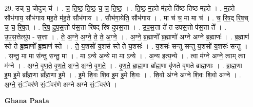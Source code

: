 \documentclass[17pt]{extarticle}
\begin{document}
29. उच् च॒ चोदुच् च॑ । . च॒ ति॒ष्ठ॒ ति॒ष्ठ॒ च॒ च॒ ति॒ष्ठ॒ । . ति॒ष्ठ॒ म॒ह॒ते म॑ह॒ते ति॑ष्ठ तिष्ठ मह॒ते । . म॒ह॒ते सौभ॑गाय॒ सौभ॑गाय मह॒ते म॑ह॒ते सौभ॑गाय । . सौभ॑गा॒येति॒ सौभ॑गाय । . मा च॑ च॒ मा मा च॑ । . च॒ रि॒ष॒द् रि॒ष॒च् च॒ च॒ रि॒ष॒त् । . रि॒ष॒ दु॒प॒स॒त्तो प॑स॒त्ता रि॑षद् रिष दुपस॒त्ता । . उ॒प॒स॒त्ता ते॑ त उपस॒त्तो प॑स॒त्ता ते᳚ । . उ॒प॒स॒त्तेत्यु॑प - स॒त्ता । . ते॒ अ॒ग्ने॒ अ॒ग्ने॒ ते॒ ते॒ अ॒ग्ने॒ । . अ॒ग्ने॒ ब्र॒ह्माणो᳚ ब्र॒ह्माणो॑ अग्ने अग्ने ब्र॒ह्माणः॑ । . ब्र॒ह्माण॑ स्ते ते ब्र॒ह्माणो᳚ ब्र॒ह्माण॑ स्ते । . ते॒ य॒शसो॑ य॒शस॑ स्ते ते य॒शसः॑ । . य॒शसः॑ सन्तु सन्तु य॒शसो॑ य॒शसः॑ सन्तु । . स॒न्तु॒ मा मा स॑न्तु सन्तु॒ मा । . मा ऽन्ये अ॒न्ये मा मा ऽन्ये । . अ॒न्य इत्य॒न्ये । . त्वा म॑ग्ने अग्ने॒ त्वाम् त्वा म॑ग्ने । . अ॒ग्ने॒ वृ॒ण॒ते॒ वृ॒ण॒ते॒ अ॒ग्ने॒ अ॒ग्ने॒ वृ॒ण॒ते॒ । . वृ॒ण॒ते॒ ब्रा॒ह्म॒णा ब्रा᳚ह्म॒णा वृ॑णते वृणते ब्राह्म॒णाः । . ब्रा॒ह्म॒णा इ॒म इ॒मे ब्रा᳚ह्म॒णा ब्रा᳚ह्म॒णा इ॒मे । . इ॒मे शि॒वः शि॒व इ॒म इ॒मे शि॒वः । . शि॒वो अ॑ग्ने अग्ने शि॒वः शि॒वो अ॑ग्ने । . अ॒ग्ने॒ सं॒ॅवर॑णे सं॒ॅवर॑णे अग्ने अग्ने सं॒ॅवर॑णे । \newline

\textbf{Ghana Paata } \newline
\end{document}
